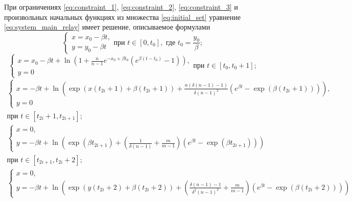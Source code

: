 \begin{theorem}
	При ограничениях \eqref{eq:constraint_1}, \eqref{eq:constraint_2}, \eqref{eq:constraint_3}  и произвольных начальных функциях из множества \eqref{eq:initial_set} уравнение \eqref{eq:system_main_relay} имеет решение, описываемое формулами
	\small
	\begin{equation}
		\label{eq:step1_solution}
		\begin{cases}
			x = x_0 - \beta t,\\
			y = y_0 - \beta t
		\end{cases}
		\text{при } t \in [0, t_0], \text{ где } t_0 = \dfrac{y_0}{\beta};
	\end{equation}
	\begin{equation}
		\label{eq:step2_solution}
		\begin{cases}
			x = x_0 - \beta t + \ln\left(1 + \frac{n}{n - 1} e^{-x_0 + \beta t_0}  (e^{\beta  (t - t_0)} - 1)\right),\\
			y = 0
		\end{cases}
		\text{при } t \in [t_0, t_0 + 1];
	\end{equation}
	\begin{multline}
		\label{eq:step3_solution}
		\begin{cases}
			x = -\beta t + \ln\left(\exp(x(t_{2i} + 1) + \beta (t_{2i} + 1)) + \frac{n (\delta(n - 1) - 1)}{\delta (n - 1)^2} (e^{\beta t} - \exp(\beta (t_{2i} + 1)))\right)
			,\\
			y = 0
		\end{cases}\\
		\text{при } t \in [t_{2i} + 1, t_{2i + 1}];
	\end{multline}
	\begin{multline}
		\label{eq:step4_solution}
		\begin{cases}
			x = 0,\\
			y = -\beta t + \ln\left(\exp(\beta t_{2i + 1}) + \left(\frac{1}{\delta(n - 1)} + \frac{m}{m - 1}\right) (e^{\beta t} - \exp(\beta t_{2i + 1}))\right)
		\end{cases}\\
		\text{при } t \in [t_{2i + 1}, t_{2i} + 2];
	\end{multline}
	\begin{multline}
		\label{eq:step5_solution}
		\begin{cases}
			x = 0,\\
			y = -\beta t + \ln\left(\exp(y(t_{2i} + 2) + \beta (t_{2i} + 2)) + \left(\frac{\delta(n - 1) - 1}{\delta^2 (n - 1)^2} + \frac{m}{m - 1}\right) (e^{\beta t} - \exp(\beta (t_{2i} + 2)))\right)

\end{cases}
\end{multline}
\end{theorem}
